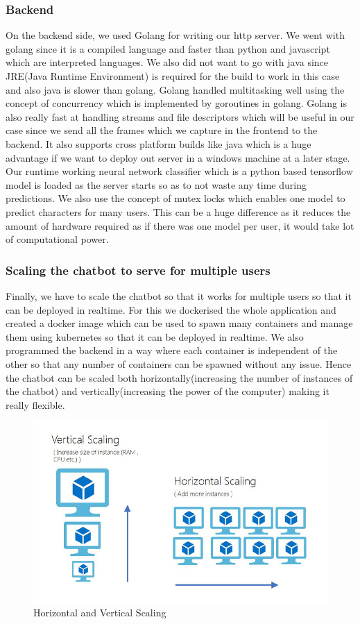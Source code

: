 \documentclass[12pt,a4paper]{report}
\begin{document}
\subsubsection{Backend}
On the backend side, we used Golang for writing our http server. We went with golang since it is a compiled language and faster than python and javascript which are interpreted languages. We also did not want to go with java since JRE(Java Runtime Environment) is required for the build to work in this case and also java is slower than golang. Golang handled multitasking well using the concept of concurrency which is implemented by goroutines in golang. Golang is also really fast at handling streams and file descriptors which will be useful in our case since we send all the frames which we capture in the frontend to the backend. It also supports cross platform builds like java which is a huge advantage if we want to deploy out server in a windows machine at a later stage. Our runtime working neural network classifier which is a python based tensorflow model is loaded as the server starts so as to not waste any time during predictions. We also use the concept of mutex locks which enables one model to predict characters for many users. This can be a huge difference as it reduces the amount of hardware required as if there was one model per user, it would take lot of computational power.

\subsubsection{Scaling the chatbot to serve for multiple users}
Finally, we have to scale the chatbot so that it works for multiple users so that it can be deployed in realtime. For this we dockerised the whole application and created a docker image which can be used to spawn many containers and manage them using kubernetes so that it can be deployed in realtime. We also programmed the backend in a way where each container is independent of the other so that any number of containers can be spawned without any issue. Hence the chatbot can be scaled both horizontally(increasing the number of instances of the chatbot) and vertically(increasing the power of the computer) making it really flexible.
\begin{figure}[htbp]
	\centerline{\includegraphics[scale=0.3]{hvsv.jpg}}
	\caption{Horizontal and Vertical Scaling}
  \label{Havs}
\end{figure}
\end{document}
